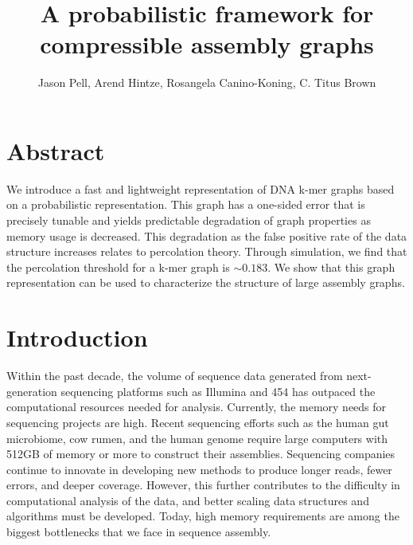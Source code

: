 \documentclass[12pt]{article} \usepackage{simplemargins}
\begin{document}
\title{A probabilistic framework for compressible assembly graphs}
\author{Jason Pell, Arend Hintze, Rosangela Canino-Koning, C. Titus Brown}

\maketitle

\section{Abstract}

We introduce a fast and lightweight representation of DNA k-mer graphs
based on a probabilistic representation.  This graph has a one-sided
error that is precisely tunable and yields predictable degradation of
graph properties as memory usage is decreased. This degradation as the false 
positive rate of the data structure increases relates to percolation theory. Through 
simulation, we find that the percolation threshold for a k-mer graph 
is $\sim 0.183$. We show that this
graph representation can be used to characterize the structure of
large assembly graphs.

\section{Introduction}

Within the past decade, the volume of sequence data generated
from next-generation sequencing platforms such as Illumina and 454
has outpaced the computational resources needed for
analysis. Currently, the memory needs for sequencing projects 
are high. Recent sequencing efforts such as the human gut
microbiome\cite{pmid20203603}, cow rumen\cite{pmid21273488}, and the 
human genome\cite{pmid21187386} require large computers with 512GB of memory
or more to construct their assemblies.  
Sequencing companies continue to innovate in developing new 
methods to produce longer reads, fewer errors, 
and deeper coverage. However, this further contributes 
to the difficulty in computational 
analysis of the data, and better scaling data structures and algorithms 
must be developed. Today, high memory requirements are
among the biggest bottlenecks that we face in sequence assembly.
\end{document}

